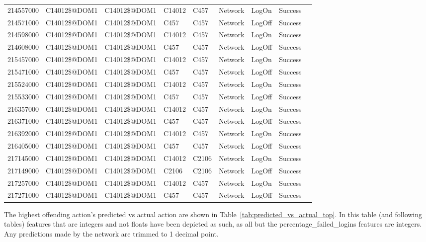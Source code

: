 \begin{table}[htbp]
{\begin{tabular}{lllllllll}
			214557000 & C14012\$@DOM1 & C14012\$@DOM1 & C14012 & C457 & Network & LogOn & Success \\
			214571000 & C14012\$@DOM1 & C14012\$@DOM1 & C457 & C457 & Network & LogOff & Success \\
			214598000 & C14012\$@DOM1 & C14012\$@DOM1 & C14012 & C457 & Network & LogOn & Success \\
			214608000 & C14012\$@DOM1 & C14012\$@DOM1 & C457 & C457 & Network & LogOff & Success \\
			215457000 & C14012\$@DOM1 & C14012\$@DOM1 & C14012 & C457 & Network & LogOn & Success \\
			215471000 & C14012\$@DOM1 & C14012\$@DOM1 & C457 & C457 & Network & LogOff & Success \\
			215524000 & C14012\$@DOM1 & C14012\$@DOM1 & C14012 & C457 & Network & LogOn & Success \\
			215533000 & C14012\$@DOM1 & C14012\$@DOM1 & C457 & C457 & Network & LogOff & Success \\
			216357000 & C14012\$@DOM1 & C14012\$@DOM1 & C14012 & C457 & Network & LogOn & Success \\
			216371000 & C14012\$@DOM1 & C14012\$@DOM1 & C457 & C457 & Network & LogOff & Success \\
			216392000 & C14012\$@DOM1 & C14012\$@DOM1 & C14012 & C457 & Network & LogOn & Success \\
			216405000 & C14012\$@DOM1 & C14012\$@DOM1 & C457 & C457 & Network & LogOff & Success \\
			217145000 & C14012\$@DOM1 & C14012\$@DOM1 & C14012 & C2106 & Network & LogOn & Success \\
			217149000 & C14012\$@DOM1 & C14012\$@DOM1 & C2106 & C2106 & Network & LogOff & Success \\
			217257000 & C14012\$@DOM1 & C14012\$@DOM1 & C14012 & C457 & Network & LogOn & Success \\
			217271000 & C14012\$@DOM1 & C14012\$@DOM1 & C457 & C457 & Network & LogOff & Success
		\end{tabular}
	}
\end{table}

The highest offending action's predicted vs actual action are shown in Table~\ref{tab:predicted_vs_actual_top}. In this table (and following tables) features that are integers and not floats have been depicted as such, as all but the percentage_failed_logins features are integers. Any predictions made by the network are trimmed to 1 decimal point.

